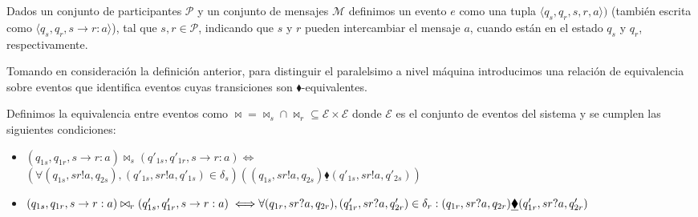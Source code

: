 \begin{definition}[Eventos] Dados un conjunto de participantes $\mathcal{P}$ y un conjunto de mensajes $\mathcal{M}$ definimos un evento $e$ como una tupla $\langle q_s, q_r, s, r, a \rangle)$ (también escrita como $\langle q_s, q_r, s \rightarrow r:a \rangle$), tal que $s,r \in \mathcal{P}$, indicando que $s$ y $r$ pueden intercambiar el mensaje $a$, cuando están en el estado $q_s$ y $q_r$, respectivamente.
\end{definition}

Tomando en consideración la definición anterior, para distinguir el paralelsimo a nivel máquina introducimos una relación de equivalencia sobre eventos que identifica eventos cuyas transiciones son $\blacklozenge$-equivalentes.

\begin{definition} Definimos la equivalencia entre eventos como $\bowtie = \bowtie_s \cap \bowtie_r \subseteq \mathcal{E} \times \mathcal{E}$ donde $\mathcal{E}$ es el conjunto de eventos del sistema y se cumplen las siguientes condiciones:

\begin{itemize}
\item $(q_{1s}, q_{1r}, s \rightarrow r:a) \bowtie_s (q'_{1s}, q'_{1r}, s \rightarrow r:a) \iff$ \\ 
 $(\forall (q_{1s}, sr!a,q_{2s}),(q'_{1s}, sr!a,q'_{1s}) \in \delta_s)((q_{1s}, sr!a,q_{2s}) \underline{\blacklozenge} (q'_{1s}, sr!a,q'_{2s})) $
\item $(q_{1s}, q_{1r}, s \rightarrow r:a) \bowtie_r (q'_{1s}, q'_{1r}, s \rightarrow r:a) \iff \\ 
\forall (q_{1r}, sr?a,q_{2r}),(q'_{1r}, sr?a,q'_{2r}) \in \delta_ r:(q_{1r}, sr?a,q_{2r}) \underline{\blacklozenge} (q'_{1r}, sr?a,q'_{2r})$ \end{itemize}
\end{definition}

